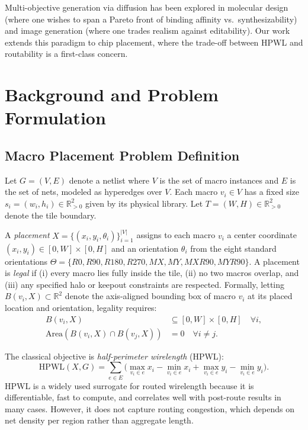 \documentclass[lettersize,journal]{IEEEtran}
\begin{document}
Multi-objective generation via diffusion has been explored in molecular design (where one wishes to span a Pareto front of binding affinity vs.\ synthesizability) and image generation (where one trades realism against editability). Our work extends this paradigm to chip placement, where the trade-off between HPWL and routability is a first-class concern.

\section{Background and Problem Formulation}
\label{sec:background}

\subsection{Macro Placement Problem Definition}

Let $G = (V, E)$ denote a netlist where $V$ is the set of macro instances and $E$ is the set of nets, modeled as hyperedges over $V$. Each macro $v_i \in V$ has a fixed size $s_i = (w_i, h_i) \in \mathbb{R}^2_{>0}$ given by its physical library. Let $T = (W, H) \in \mathbb{R}^2_{>0}$ denote the tile boundary.

A \emph{placement} $X = \{(x_i, y_i, \theta_i)\}_{i=1}^{|V|}$ assigns to each macro $v_i$ a center coordinate $(x_i, y_i) \in [0, W] \times [0, H]$ and an orientation $\theta_i$ from the eight standard orientations $\Theta = \{R0, R90, R180, R270, MX, MY, MXR90, MYR90\}$. A placement is \emph{legal} if (i) every macro lies fully inside the tile, (ii) no two macros overlap, and (iii) any specified halo or keepout constraints are respected. Formally, letting $B(v_i, X) \subset \mathbb{R}^2$ denote the axis-aligned bounding box of macro $v_i$ at its placed location and orientation, legality requires:
\begin{align}
B(v_i, X) &\subseteq [0, W] \times [0, H] \quad \forall i, \label{eq:legal_inside}\\
\text{Area}(B(v_i, X) \cap B(v_j, X)) &= 0 \quad \forall i \neq j. \label{eq:legal_nonoverlap}
\end{align}

The classical objective is \emph{half-perimeter wirelength} (HPWL):
\begin{equation}
\label{eq:hpwl}
\text{HPWL}(X, G) = \sum_{e \in E}\!\Bigg(\!\!\!\max_{v_i \in e}\!x_i - \!\!\!\min_{v_i \in e}\!x_i + \!\!\max_{v_i \in e}\!y_i - \!\!\!\min_{v_i \in e}\!y_i\!\Bigg)\!\!.
\end{equation}
HPWL is a widely used surrogate for routed wirelength because it is differentiable, fast to compute, and correlates well with post-route results in many cases. However, it does not capture routing congestion, which depends on net density per region rather than aggregate length.
\end{document}
